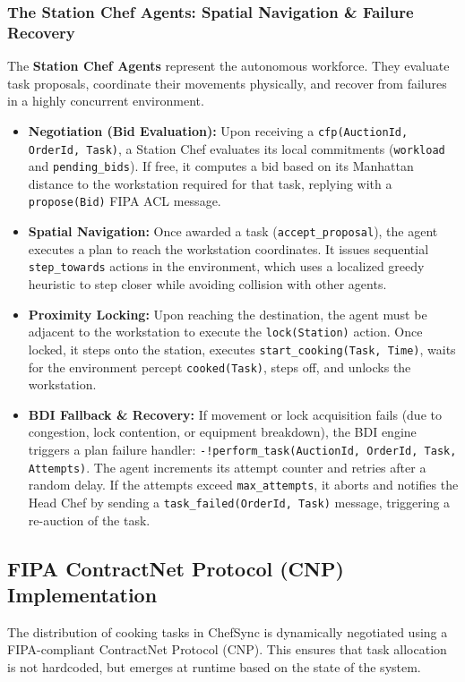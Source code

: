 \documentclass{scrartcl}
\begin{document}
\subsubsection{The Station Chef Agents: Spatial Navigation \& Failure Recovery}
The \textbf{Station Chef Agents} represent the autonomous workforce. They evaluate task proposals, coordinate their movements physically, and recover from failures in a highly concurrent environment.
\begin{itemize}
\item \textbf{Negotiation (Bid Evaluation):} Upon receiving a \texttt{cfp(AuctionId, OrderId, Task)}, a Station Chef evaluates its local commitments (\texttt{workload} and \texttt{pending\_bids}). If free, it computes a bid based on its Manhattan distance to the workstation required for that task, replying with a \texttt{propose(Bid)} FIPA ACL message.
\item \textbf{Spatial Navigation:} Once awarded a task (\texttt{accept\_proposal}), the agent executes a plan to reach the workstation coordinates. It issues sequential \texttt{step\_towards} actions in the environment, which uses a localized greedy heuristic to step closer while avoiding collision with other agents.
\item \textbf{Proximity Locking:} Upon reaching the destination, the agent must be adjacent to the workstation to execute the \texttt{lock(Station)} action. Once locked, it steps onto the station, executes \texttt{start\_cooking(Task, Time)}, waits for the environment percept \texttt{cooked(Task)}, steps off, and unlocks the workstation.
\item \textbf{BDI Fallback \& Recovery:} If movement or lock acquisition fails (due to congestion, lock contention, or equipment breakdown), the BDI engine triggers a plan failure handler: \texttt{-!perform\_task(AuctionId, OrderId, Task, Attempts)}. The agent increments its attempt counter and retries after a random delay. If the attempts exceed \texttt{max\_attempts}, it aborts and notifies the Head Chef by sending a \texttt{task\_failed(OrderId, Task)} message, triggering a re-auction of the task.
\end{itemize}

\subsection{FIPA ContractNet Protocol (CNP) Implementation}

The distribution of cooking tasks in ChefSync is dynamically negotiated using a FIPA-compliant ContractNet Protocol (CNP). This ensures that task allocation is not hardcoded, but emerges at runtime based on the state of the system.
\end{document}
